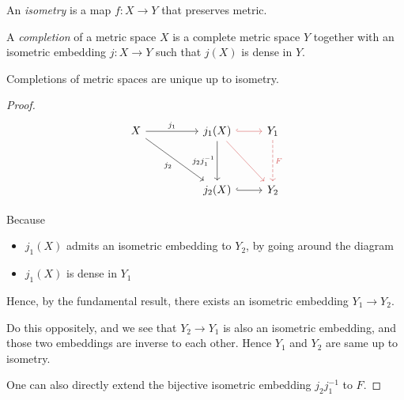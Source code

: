 \begin{definition}[Isometry]
	\label{defn:Isometry}
	An \textit{isometry} is a map $f: X \to  Y$ that preserves metric.
\end{definition}

\begin{definition}[Completion]
	\label{defn:Completion}
	A \textit{completion} of a metric space $X$ is a complete metric space $Y$ together with an isometric embedding $j: X \to  Y$ such that $j(X)$ is dense in $Y$. 
\end{definition}

\begin{lemma}
	\label{lem:UniquenessOfCompletion}
	Completions of metric spaces are unique up to isometry.
\end{lemma}
\begin{proof}
\[\begin{tikzcd}
	X && {j_1(X)} & {Y_1} \\
	\\
	&& {j_2(X)} & {Y_2}
	\arrow["{j_1}", from=1-1, to=1-3]
	\arrow["{j_2}"', from=1-1, to=3-3]
	\arrow["{j_2j_1^{-1}}"', from=1-3, to=3-3]
	\arrow["F", color={rgb,255:red,214;green,92;blue,92}, dashed, from=1-4, to=3-4]
	\arrow[color={rgb,255:red,214;green,92;blue,92}, hook, from=1-3, to=1-4]
	\arrow[hook, from=3-3, to=3-4]
	\arrow[color={rgb,255:red,214;green,92;blue,92}, from=1-3, to=3-4]
\end{tikzcd}\]

Because
\begin{itemize}
	\item $j_1(X)$ admits an isometric embedding to $Y_2$, by going around the diagram 
	\item $j_1(X)$ is dense in $Y_1$
\end{itemize}
Hence, by the fundamental result, there exists an isometric embedding $Y_1 \to Y_2$.

Do this oppositely, and we see that $Y_2 \to Y_1$ is also an isometric embedding, and those two embeddings are inverse to each other. Hence $Y_1 $ and $Y_2$ are same up to isometry.

One can also directly extend the bijective isometric embedding $j_2 j_1^{-1}$ to $F$.

\end{proof}

